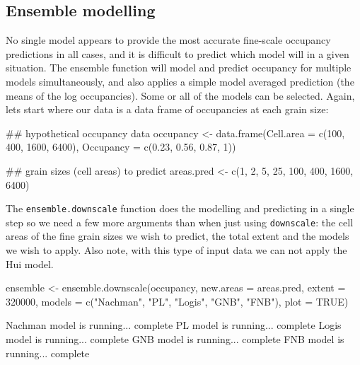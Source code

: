 \documentclass{article}[12pt, a4paper]
\begin{document}
\subsection{Ensemble modelling}
No single model appears to provide the most accurate fine-scale occupancy predictions in all cases, and it is difficult to predict which model will in a given situation. The ensemble function will model and predict occupancy for multiple models simultaneously, and also applies a simple model averaged prediction (the means of the log occupancies). Some or all of the models can be selected. Again, lets start where our data is a data frame of occupancies at each grain size:

\begin{Schunk}
\begin{Sinput}
## hypothetical occupancy data
occupancy <- data.frame(Cell.area = c(100, 400, 1600, 6400),
                        Occupancy = c(0.23, 0.56, 0.87, 1))
                        
## grain sizes (cell areas) to predict
areas.pred <- c(1, 2, 5, 25, 100, 400, 1600, 6400)
\end{Sinput}
\end{Schunk}

The \texttt{ensemble.downscale} function does the modelling and predicting in a single step so we need a few more arguments than when just using \texttt{downscale}: the cell areas of the fine grain sizes we wish to predict, the total extent and the models we wish to apply. Also note, with this type of input data we can not apply the Hui model.

\begin{Schunk}
\begin{Sinput}
ensemble <- ensemble.downscale(occupancy,
                               new.areas = areas.pred,
                               extent = 320000,
                               models = c("Nachman",
                                          "PL",
                                          "Logis",
                                          "GNB",
                                          "FNB"),
                               plot = TRUE)
\end{Sinput}
\begin{Soutput}
Nachman model is running...  complete 
PL model is running...  complete 
Logis model is running...  complete 
GNB model is running...  complete 
FNB model is running...  complete 
\end{Soutput}
\end{Schunk}
\end{document}
